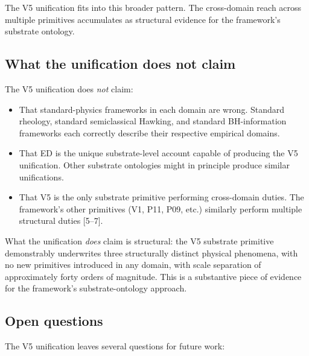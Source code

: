 \documentclass[11pt,a4paper]{article}
\begin{document}
The V5 unification fits into this broader pattern. The cross-domain reach across multiple primitives accumulates as structural evidence for the framework's substrate ontology.

\subsection{What the unification does not claim}

The V5 unification does \emph{not} claim:
\begin{itemize}[noitemsep]
\item That standard-physics frameworks in each domain are wrong. Standard rheology, standard semiclassical Hawking, and standard BH-information frameworks each correctly describe their respective empirical domains.
\item That ED is the unique substrate-level account capable of producing the V5 unification. Other substrate ontologies might in principle produce similar unifications.
\item That V5 is the only substrate primitive performing cross-domain duties. The framework's other primitives (V1, P11, P09, etc.) similarly perform multiple structural duties [5--7].
\end{itemize}

What the unification \emph{does} claim is structural: the V5 substrate primitive demonstrably underwrites three structurally distinct physical phenomena, with no new primitives introduced in any domain, with scale separation of approximately forty orders of magnitude. This is a substantive piece of evidence for the framework's substrate-ontology approach.

\subsection{Open questions}

The V5 unification leaves several questions for future work:
\end{document}

